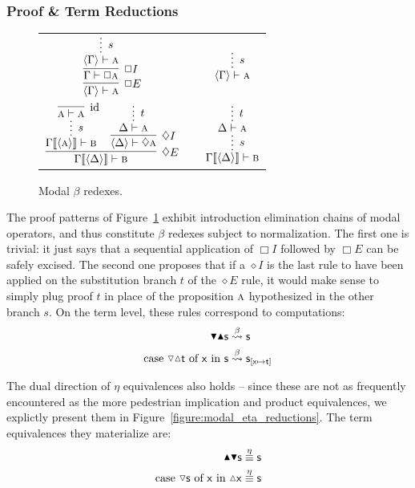 \subsubsection{Proof \& Term Reductions}
\begin{figure}
	\centering
		\begin{tabularx}{0.85\textwidth}{@{}ccc@{}}
		$\infer[\Box E]{\bracket{\Gamma} \vdash \prop{A}}{
			\infer[\Box I]{\Gamma \vdash \Box \prop{A}}{
				\infer*[s]{\bracket{\Gamma} \vdash  \prop{A}}{}
			}
		}
		$
		&
		\raisebox{10pt}{$\implies$}
		&
		$\infer*[s]{\bracket{\Gamma} \vdash \prop{A}}{}
		$\\[\smallsep]
		$\infer[\diamond E]{\Gamma\ctx{\bracket{\Delta}} \vdash \prop{B}}{
			\infer*[s]{\Gamma\ctx{\bracket{\prop{A}}} \vdash \prop{B}}{
				\infer[\Ax]{\prop{A} \vdash \prop{A}}{}}
			&
			\infer[\diamond I]{\bracket{\Delta} \vdash \diamond\prop{A}}{
				\infer*[t]{\Delta \vdash \prop{A}}{}
			}
		}
		$
		&
		\raisebox{20pt}{$\implies$}
		&
		$\infer*[s]{\Gamma\ctx{\bracket{\Delta}} \vdash \prop{B}}{
			\infer*[t]{\Delta \vdash \prop{A}}{}
		}
		$
		\end{tabularx}
		\caption{Modal $\beta$ redexes.}
		\label{figure:modal_beta_reductions}
\end{figure}

The proof patterns of Figure~\ref{figure:modal_beta_reductions} exhibit introduction elimination chains of modal operators, and thus constitute $\beta$ redexes subject to normalization.
The first one is trivial: it just says that a sequential application of $\Box I$ followed by $\Box E$ can be safely excised.
The second one proposes that if a $\diamond I$ is the last rule to have been applied on the substitution branch $t$ of the $\diamond E$ rule, it would make sense to simply plug proof $t$ in place of the proposition $\smallprop{A}$ hypothesized in the other  branch $s$.
On the term level, these rules correspond to computations:
\begin{align*}
\boxelim \boxintro \term{s} & \bred \term{s}\\
\cterm{case \term{\diaelim \diaintro t} of \term{x} in \term{s}} & \bred \term{s}_{[\term{x} \mapsto \term{t}]}
\end{align*}

The dual direction of $\eta$ equivalences also holds -- since these are not as frequently encountered as the more pedestrian implication and product equivalences, we explictly present them in Figure~\ref{figure:modal_eta_reductions}.
The term equivalences they materialize are:
\begin{align*}
\boxintro \boxelim \term{s} & \overset{\eta}{\equiv} \term{s}\\
\cterm{case \term{\diaelim{s}} of \term{x} in \term{\diaintro{x}}} & \overset{\eta}{\equiv} \term{s}
\end{align*}

